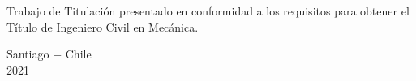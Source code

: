 {\vspace{0.5\baselineskip}

\begin{flushright}
\begin{minipage}{7cm}
\small{Trabajo de Titulación presentado en conformidad a los requisitos para obtener el Título de Ingeniero Civil en Mecánica.}
\end{minipage}
\end{flushright}

\vspace{3\baselineskip}

\begin{center}
\begin{minipage}[c]{15cm}
\centering
\small{Santiago $-$ Chile \\ 2021}
\end{minipage}
\end{center}

\restoregeometry
}
